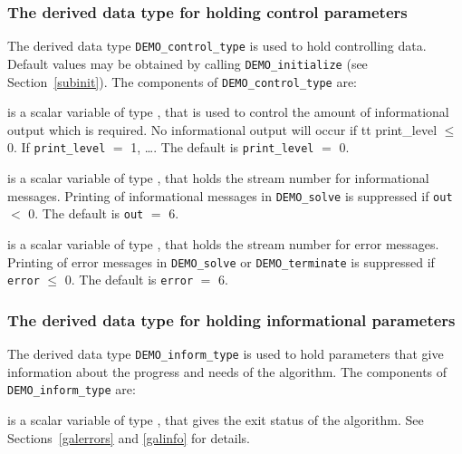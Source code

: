\documentclass{galahad}
\newcommand{\packagename}{DEMO}
\begin{document}

\subsubsection{The derived data type for holding control 
 parameters}\label{typecontrol}
The derived data type 
{\tt \packagename\_control\_type} 
is used to hold controlling data. Default values may be obtained by calling 
{\tt \packagename\_initialize}
(see Section~\ref{subinit}). The components of 
{\tt \packagename\_control\_type} 
are:

\begin{description}

 is a scalar variable of type \integer, that is used
to control the amount of informational output which is required. No 
informational output will occur if {tt print\_level} $\leq$ 0. If 
{\tt print\_level} $=$ 1, \ldots .
The default is {\tt print\_level} $=$ 0.

 is a scalar variable of type \integer, that holds the
stream number for informational messages.
Printing of informational messages in 
{\tt \packagename\_solve}
is suppressed if {\tt out} $<$ 0.
The default is {\tt out} $=$ 6.

 is a scalar variable of type \integer, that holds the
stream number for error messages.
Printing of error messages in 
{\tt \packagename\_solve}
or 
{\tt \packagename\_terminate}
is suppressed if {\tt error} $\leq$ 0.
The default is {\tt error} $=$ 6.

\end{description}


\subsubsection{The derived data type for holding informational
 parameters}\label{typeinform}
The derived data type 
{\tt \packagename\_inform\_type} 
is used to hold parameters that give information about the progress and needs 
of the algorithm. The components of
{\tt \packagename\_inform\_type} 
are:

\begin{description}
 is a scalar variable of type \integer, that gives the
exit status of the algorithm. See Sections~\ref{galerrors} and \ref{galinfo}
for details.
\end{description}
\end{document}
